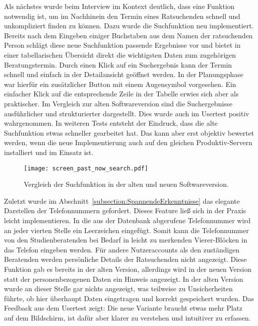 Als nächstes wurde beim Interview im Kontext deutlich, dass eine Funktion
notwendig ist, um im Nachhinein den Termin eines Ratsuchenden schnell und
unkompliziert finden zu können. Dazu wurde die Suchfunktion neu
implementiert. Bereits nach dem Eingeben einiger Buchstaben aus dem Namen der
ratsuchenden Person schlägt diese neue Suchfunktion passende Ergebnisse vor und
bietet in einer tabellarischen Übersicht direkt die wichtigsten Daten zum
zugehörigen Beratungstermin. Durch einen Klick auf ein Suchergebnis kann der
Termin schnell und einfach in der Detailansicht geöffnet werden. In der
Planungsphase war hierfür ein zusätzlicher Button mit einem Augensymbol vorgesehen.
Ein einfacher Klick auf die entsprechende Zeile in der Tabelle erwies sich aber
als praktischer. Im Vergleich zur alten Softwareversion sind die
Suchergebnisse ausführlicher und strukturierter dargestellt. Dies
wurde auch im Usertest positiv wahrgenommen. In weiteren Tests entsteht der
Eindruck, dass die alte Suchfunktion etwas schneller gearbeitet hat. Das kann
aber erst objektiv bewertet werden, wenn die neue Implementierung auch auf den
gleichen Produktiv-Servern installiert und im Einsatz ist.

\begin{figure}[H]
    \caption{Vergleich der Suchfunktion in der alten und neuen Softwareversion.}
    \centering
    \texttt{[image: screen\_past\_now\_search.pdf]}
\end{figure}

Zuletzt wurde im Abschnitt~\ref{subsection:SpannendeErkenntnisse} das
elegante Darstellen der Telefonnummern gefordert. Dieses Feature ließ sich in
der Praxis leicht implementieren. In die aus der Datenbank abgerufene 
Telefonnummer wird an jeder vierten Stelle ein Leerzeichen eingefügt. Somit
kann die Telefonnummer von den Studienberatenden bei Bedarf in leicht zu
merkenden Vierer-Blöcken in das Telefon eingeben werden. Für andere
Nutzeraccounts als den zuständigen Beratenden werden persönliche Details der
Ratsuchenden nicht angezeigt. Diese Funktion gab es bereits in der alten Version, allerdings wird in der neuen Version statt der personenbezogenen Daten ein
Hinweis angezeigt. In der alten Version wurde an dieser Stelle gar nichts
angezeigt, was teilweise zu Unsicherheiten führte, ob hier überhaupt Daten
eingetragen und korrekt gespeichert wurden. Das Feedback aus dem Usertest
zeigt: Die neue Variante braucht etwas mehr Platz auf dem Bildschirm, ist dafür
aber klarer zu verstehen und intuitiver zu erfassen.

